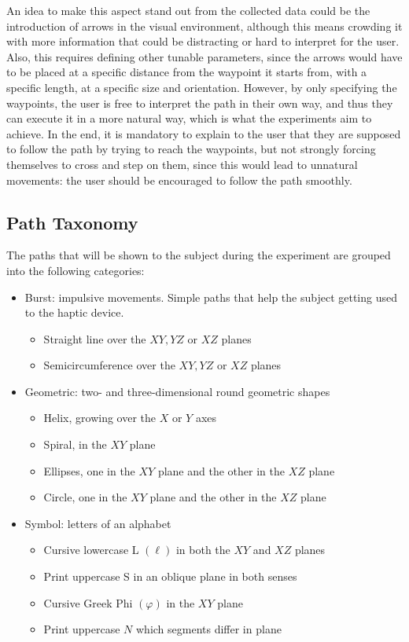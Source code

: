 \documentclass[12pt]{report}
\begin{document}
An idea to make this aspect stand out from the collected data could be the introduction of arrows in the visual environment, although this means crowding it with more information that could be distracting or hard to interpret for the user. Also, this requires defining other tunable parameters, since the arrows would have to be placed at a specific distance from the waypoint it starts from, with a specific length, at a specific size and orientation. However, by only specifying the waypoints, the user is free to interpret the path in their own way, and thus they can execute it in a more natural way, which is what the experiments aim to achieve. In the end, it is mandatory to explain to the user that they are supposed to follow the path by trying to reach the waypoints, but not strongly forcing themselves to cross and step on them, since this would lead to unnatural movements: the user should be encouraged to follow the path smoothly.

\subsection{Path Taxonomy}
The paths that will be shown to the subject during the experiment are grouped into the following categories: 
\begin{itemize}
    \item Burst: impulsive movements. Simple paths that help the subject getting used to the haptic device. 
    \begin{itemize}
        \item Straight line over the $XY, YZ$ or $XZ$ planes
        \item Semicircumference over the $XY, YZ$ or $XZ$ planes
    \end{itemize}
    \item Geometric: two- and three-dimensional round geometric shapes
    \begin{itemize}
        \item Helix, growing over the $X$ or $Y$ axes
        \item Spiral, in the $XY$ plane
        \item Ellipses, one in the $XY$ plane and the other in the $XZ$ plane
        \item Circle, one in the $XY$ plane and the other in the $XZ$ plane
    \end{itemize}
    \item Symbol: letters of an alphabet
    \begin{itemize}
        \item Cursive lowercase L $\left(\ell\right)$ in both the $XY$ and $XZ$ planes
        \item Print uppercase S in an oblique plane in both senses
        \item Cursive Greek Phi $\left(\varphi\right)$ in the $XY$ plane
        \item Print uppercase $N$ which segments differ in plane 
    \end{itemize}
\end{itemize}
\end{document}
